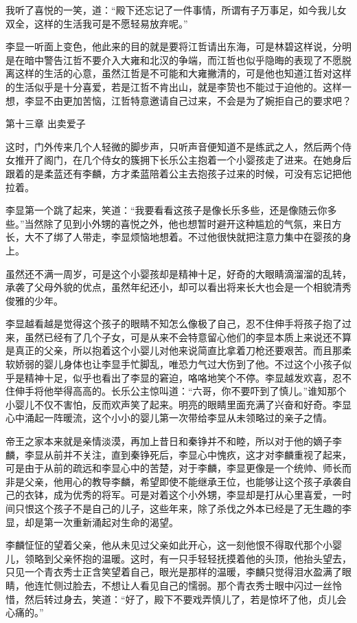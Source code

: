 我听了喜悦的一笑，道：“殿下还忘记了一件事情，所谓有子万事足，如今我儿女双全，这样的生活我可是不愿轻易放弃呢。”

李显一听面上变色，他此来的目的就是要将江哲请出东海，可是林碧这样说，分明是在暗中警告江哲不要介入大雍和北汉的争端，而江哲也似乎隐晦的表现了不愿脱离这样的生活的心意，虽然江哲是不可能和大雍撇清的，可是他也知道江哲对这样的生活似乎是十分喜爱，若是江哲不肯出山，就是李贽也不能过于迫他的。这样一想，李显不由更加苦恼，江哲特意邀请自己过来，不会是为了婉拒自己的要求吧？

第十三章    出卖爱子

这时，门外传来几个人轻微的脚步声，只听声音便知道不是练武之人，然后两个侍女推开了阁门，在几个侍女的簇拥下长乐公主抱着一个小婴孩走了进来。在她身后跟着的是柔蓝还有李麟，方才柔蓝陪着公主去抱孩子过来的时候，可没有忘记把他拉着。

李显第一个跳了起来，笑道：“我要看看这孩子是像长乐多些，还是像随云你多些。”当然除了见到小外甥的喜悦之外，他也想暂时避开这种尴尬的气氛，来日方长，大不了绑了人带走，李显烦恼地想着。不过他很快就把注意力集中在婴孩的身上。

虽然还不满一周岁，可是这个小婴孩却是精神十足，好奇的大眼睛滴溜溜的乱转，承袭了父母外貌的优点，虽然年纪还小，却可以看出将来长大也会是一个相貌清秀俊雅的少年。

李显越看越是觉得这个孩子的眼睛不知怎么像极了自己，忍不住伸手将孩子抱了过来，虽然已经有了几个子女，可是从来不会特意留心他们的李显本质上来说还不算是真正的父亲，所以抱着这个小婴儿对他来说简直比拿着刀枪还要艰苦。而且那柔软娇弱的婴儿身体也让李显手忙脚乱，唯恐力气过大伤到了他。不过这个小孩子似乎是精神十足，似乎也看出了李显的窘迫，咯咯地笑个不停。李显越发欢喜，忍不住伸手将他举得高高的。长乐公主惊叫道：“六哥，你不要吓到了慎儿。”谁知那个小婴儿不仅不害怕，反而欢声笑了起来。明亮的眼睛里面充满了兴奋和好奇。李显心中涌起一阵暖流，这个小小的婴儿第一次带给李显从未领略过的亲子之情。

帝王之家本来就是亲情淡漠，再加上昔日和秦铮并不和睦，所以对于他的嫡子李麟，李显从前并不关注，直到秦铮死后，李显心中愧疚，这才对李麟重视了起来，可是由于从前的疏远和李显心中的苦楚，对于李麟，李显更像是一个统帅、师长而非是父亲，他用心的教导李麟，希望即使不能继承王位，也能够让这个孩子承袭自己的衣钵，成为优秀的将军。可是对着这个小外甥，李显却是打从心里喜爱，一时间只恨这个孩子不是自己的儿子，这些年来，除了杀伐之外本已经是了无生趣的李显，却是第一次重新涌起对生命的渴望。

李麟怔怔的望着父亲，他从未见过父亲如此开心，这一刻他恨不得取代那个小婴儿，领略到父亲怀抱的温暖。这时，有一只手轻轻抚摸着他的头顶，他抬头望去，只见一个青衣秀士正含笑望着自己，眼光是那样的温暖，李麟只觉得泪水盈满了眼睛，他连忙侧过脸去，不想让人看见自己的懦弱。那个青衣秀士眼中闪过一丝怜惜，然后转过身去，笑道：“好了，殿下不要戏弄慎儿了，若是惊坏了他，贞儿会心痛的。”

